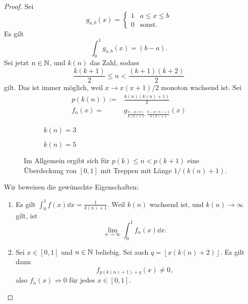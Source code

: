 \begin{proof}
Sei
\[
	g_{a,b}(x)=\begin{cases}
		1 & a \le x \le b\\
		0 & \text{sonst}.
	\end{cases}
\] 
Es gilt
\[
	\int_0^1 g_{a,b}(x)=(b-a)
.\] 
Sei jetzt $n\in \mathbb{N}$, und $k(n)$ das Zahl, sodass
\[
	\frac{k(k+1)}{2}\le n < \frac{(k+1)(k+2)}{2}
\]
gilt. Das ist immer möglich, weil $x\to x(x+1) / 2$ monoton wachsend ist. Sei 
\begin{align*}
p(k(n)):=&\frac{k(n)(k(n)+1)}{2}\\
f_n(x)=&g_{\frac{n-p(n)}{k(n)+1}, \frac{n-p(n)+1}{k(n)+1}}(x)
\end{align*}
\begin{figure}[h]
	\begin{subfigure}[c]{0.4\textwidth}
		\caption{$k(n)=3$}
	\end{subfigure}
	\hspace{\fill}
	\begin{subfigure}[c]{0.4\textwidth}
		\caption{$k(n)=5$}
	\end{subfigure}
	\caption{Im Allgemein ergibt sich f\"{u}r $p(k) \le n < p(k+1)$ eine Überdeckung von $[0,1]$ mit Treppen mit Länge $1/(k(n)+1)$.}
\end{figure}
Wir beweisen die gewünschte Eigenschaften:
\begin{enumerate}[label=(\roman*)]
	\item Es gilt $\int_0^1 f(x)\dd{x}=\frac{1}{k(n)+1}$. Weil $k(n)$ wachsend ist, und $k(n)\to \infty$ gilt, ist
		\[
			\lim_{n \to \infty} \int_0^1 f_n(x)\dd{x}
		.\] 
	\item Sei $x\in [0,1]$ und $n\in \mathbb{N}$ beliebig. Sei auch $q=\left\lfloor x(k(n)+2) \right\rfloor$. Es gilt dann
		\[
		f_{p(k(n)+1)+q}(x)\neq 0
		,\]
		also $f_n(x) \not\to 0$ f\"{u}r jedes $x\in [0,1]$.\qedhere
\end{enumerate}
\end{proof}
